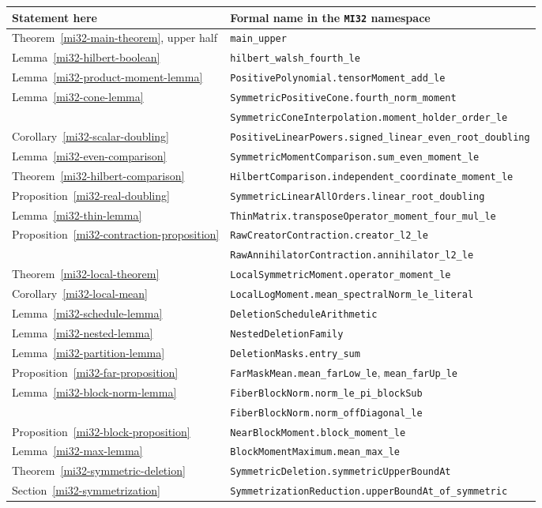 \documentclass[11pt]{article}
\theoremstyle{definition}
\theoremstyle{remark}
\begin{document}
\begin{center}\small
\begin{tabular}{@{}ll@{}}
\toprule
Statement here & Formal name in the \texttt{MI32} namespace\\
\midrule
Theorem~\ref{mi32-main-theorem}, upper half & \texttt{main\_upper}\\
Lemma~\ref{mi32-hilbert-boolean} & \texttt{hilbert\_walsh\_fourth\_le}\\
Lemma~\ref{mi32-product-moment-lemma} & \texttt{PositivePolynomial.tensorMoment\_add\_le}\\
Lemma~\ref{mi32-cone-lemma} & \texttt{SymmetricPositiveCone.fourth\_norm\_moment}\\
 & \texttt{SymmetricConeInterpolation.moment\_holder\_order\_le}\\
Corollary~\ref{mi32-scalar-doubling} & \texttt{PositiveLinearPowers.signed\_linear\_even\_root\_doubling}\\
Lemma~\ref{mi32-even-comparison} & \texttt{SymmetricMomentComparison.sum\_even\_moment\_le}\\
Theorem~\ref{mi32-hilbert-comparison} & \texttt{HilbertComparison.independent\_coordinate\_moment\_le}\\
Proposition~\ref{mi32-real-doubling} & \texttt{SymmetricLinearAllOrders.linear\_root\_doubling}\\
Lemma~\ref{mi32-thin-lemma} & \texttt{ThinMatrix.transposeOperator\_moment\_four\_mul\_le}\\
Proposition~\ref{mi32-contraction-proposition} & \texttt{RawCreatorContraction.creator\_l2\_le}\\
 & \texttt{RawAnnihilatorContraction.annihilator\_l2\_le}\\
Theorem~\ref{mi32-local-theorem} & \texttt{LocalSymmetricMoment.operator\_moment\_le}\\
Corollary~\ref{mi32-local-mean} & \texttt{LocalLogMoment.mean\_spectralNorm\_le\_literal}\\
Lemma~\ref{mi32-schedule-lemma} & \texttt{DeletionScheduleArithmetic}\\
Lemma~\ref{mi32-nested-lemma} & \texttt{NestedDeletionFamily}\\
Lemma~\ref{mi32-partition-lemma} & \texttt{DeletionMasks.entry\_sum}\\
Proposition~\ref{mi32-far-proposition} & \texttt{FarMaskMean.mean\_farLow\_le}, \texttt{mean\_farUp\_le}\\
Lemma~\ref{mi32-block-norm-lemma} & \texttt{FiberBlockNorm.norm\_le\_pi\_blockSub}\\
 & \texttt{FiberBlockNorm.norm\_offDiagonal\_le}\\
Proposition~\ref{mi32-block-proposition} & \texttt{NearBlockMoment.block\_moment\_le}\\
Lemma~\ref{mi32-max-lemma} & \texttt{BlockMomentMaximum.mean\_max\_le}\\
Theorem~\ref{mi32-symmetric-deletion} & \texttt{SymmetricDeletion.symmetricUpperBoundAt}\\
Section~\ref{mi32-symmetrization} & \texttt{SymmetrizationReduction.upperBoundAt\_of\_symmetric}\\
\bottomrule
\end{tabular}
\end{center}
\end{document}
